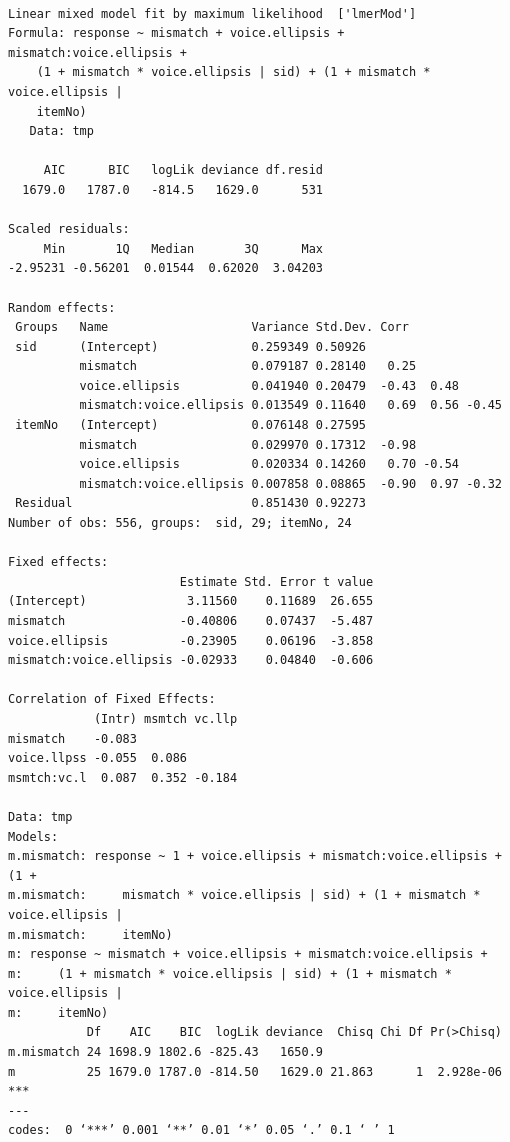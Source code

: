 \documentclass[11pt]{article}
\begin{document}
\begin{verbatim}

Linear mixed model fit by maximum likelihood  ['lmerMod']
Formula: response ~ mismatch + voice.ellipsis + mismatch:voice.ellipsis +  
    (1 + mismatch * voice.ellipsis | sid) + (1 + mismatch * voice.ellipsis |  
    itemNo)
   Data: tmp

     AIC      BIC   logLik deviance df.resid 
  1679.0   1787.0   -814.5   1629.0      531 

Scaled residuals: 
     Min       1Q   Median       3Q      Max 
-2.95231 -0.56201  0.01544  0.62020  3.04203 

Random effects:
 Groups   Name                    Variance Std.Dev. Corr             
 sid      (Intercept)             0.259349 0.50926                   
          mismatch                0.079187 0.28140   0.25            
          voice.ellipsis          0.041940 0.20479  -0.43  0.48      
          mismatch:voice.ellipsis 0.013549 0.11640   0.69  0.56 -0.45
 itemNo   (Intercept)             0.076148 0.27595                   
          mismatch                0.029970 0.17312  -0.98            
          voice.ellipsis          0.020334 0.14260   0.70 -0.54      
          mismatch:voice.ellipsis 0.007858 0.08865  -0.90  0.97 -0.32
 Residual                         0.851430 0.92273                   
Number of obs: 556, groups:  sid, 29; itemNo, 24

Fixed effects:
                        Estimate Std. Error t value
(Intercept)              3.11560    0.11689  26.655
mismatch                -0.40806    0.07437  -5.487
voice.ellipsis          -0.23905    0.06196  -3.858
mismatch:voice.ellipsis -0.02933    0.04840  -0.606

Correlation of Fixed Effects:
            (Intr) msmtch vc.llp
mismatch    -0.083              
voice.llpss -0.055  0.086       
msmtch:vc.l  0.087  0.352 -0.184

Data: tmp
Models:
m.mismatch: response ~ 1 + voice.ellipsis + mismatch:voice.ellipsis + (1 + 
m.mismatch:     mismatch * voice.ellipsis | sid) + (1 + mismatch * voice.ellipsis | 
m.mismatch:     itemNo)
m: response ~ mismatch + voice.ellipsis + mismatch:voice.ellipsis + 
m:     (1 + mismatch * voice.ellipsis | sid) + (1 + mismatch * voice.ellipsis | 
m:     itemNo)
           Df    AIC    BIC  logLik deviance  Chisq Chi Df Pr(>Chisq)    
m.mismatch 24 1698.9 1802.6 -825.43   1650.9                             
m          25 1679.0 1787.0 -814.50   1629.0 21.863      1  2.928e-06 ***
---
codes:  0 ‘***’ 0.001 ‘**’ 0.01 ‘*’ 0.05 ‘.’ 0.1 ‘ ’ 1


\end{verbatim}
\end{document}
